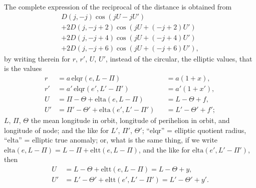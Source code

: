\documentclass[11pt,a4paper]{article}
\theoremstyle{plain}
\theoremstyle{definition}
\theoremstyle{remark}
\begin{document}
The complete expression of the reciprocal of the distance is obtained from
\begin{multline*}
D(j,-j)\cos(jU-jU')\\
+2D(j,-j+2)\cos(jU+(-j+2)U')\\
+2D(j,-j+4)\cos(jU+(-j+4)U')\\
+2D(j,-j+6)\cos(jU+(-j+6)U'),
\end{multline*}
by writing therein for $r$, $r'$, $U$, $U'$, instead of the circular, the elliptic values, that is the values
\begin{align*}
r &= a\,\text{elqr}(e,L-\Pi) &&= a(1+x),\\
r' &= a'\,\text{elqr}(e',L'-\Pi') &&= a'(1+x'),\\
U &= \Pi-\Theta+\text{elta}(e,L-\Pi) &&= L-\Theta+f,\\
U' &= \Pi'-\Theta'+\text{elta}(e',L'-\Pi') &&= L'-\Theta'+f';
\end{align*}
$L$, $\Pi$, $\Theta$ the mean longitude in orbit, longitude of perihelion in orbit, and longitude of node; and the like for $L'$, $\Pi'$, $\Theta'$; ``elqr'' = elliptic quotient radius, ``elta'' = elliptic true anomaly; or, what is the same thing, if we write $\text{elta}(e,L-\Pi)=L-\Pi+\text{eltt}(e,L-\Pi)$, and the like for $\text{elta}(e',L'-\Pi')$, then
\begin{align*}
U &= L-\Theta+\text{eltt}(e,L-\Pi) = L-\Theta+y,\\
U' &= L'-\Theta'+\text{eltt}(e',L'-\Pi') = L'-\Theta'+y'.
\end{align*}

\newpage
\end{document}
